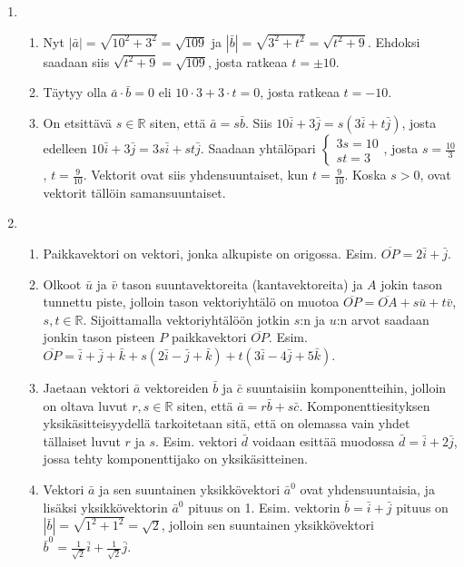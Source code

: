 \documentclass[12pt,fleqn]{article}
\begin{document}
\begin{enumerate}[label=\textbf{\arabic*.}]
\item
\begin{enumerate}[label=\textbf{\alph*)}]
\item Nyt \(|\bar{a}|=\sqrt{10^2+3^2}=\sqrt{109}\) ja \(|\bar{b}|=\sqrt{3^2+t^2}=\sqrt{t^2+9}\). Ehdoksi saadaan siis \(\sqrt{t^2+9}=\sqrt{109}\), josta ratkeaa \(t=\pm 10\).
\item Täytyy olla \(\bar{a}\cdot \bar{b}=0\) eli \(10\cdot 3+3\cdot t=0\), josta ratkeaa \(t=-10\).
\item On etsittävä \(s\in \mathbb{R}\) siten, että \(\bar{a}=s\bar{b}\). Siis \(10\bar{i}+3\bar{j}=s(3\bar{i}+t\bar{j})\), josta edelleen \(10\bar{i}+3\bar{j}=3s\bar{i}+st\bar{j}\). Saadaan yhtälöpari \(
\begin{cases}
3s=10 \\
st=3
\end{cases}
\), josta \(s=\frac{10}{3}\), \(t=\frac{9}{10}\). Vektorit ovat siis yhdensuuntaiset, kun \(t=\frac{9}{10}\). Koska \(s>0\), ovat vektorit tällöin samansuuntaiset.
\end{enumerate}

\item
\begin{enumerate}[label=\textbf{\alph*)}]
\item Paikkavektori on vektori, jonka alkupiste on origossa. Esim. \(\overline{OP}=2\bar{i}+\bar{j}\).
\item Olkoot \(\bar{u}\) ja \(\bar{v}\) tason suuntavektoreita (kantavektoreita) ja \(A\) jokin tason tunnettu piste, jolloin tason vektoriyhtälö on muotoa \(\overline{OP}=\overline{OA}+s\bar{u}+t\bar{v}\), \(s,t\in \mathbb{R}\). Sijoittamalla vektoriyhtälöön jotkin \(s\):n ja \(u\):n arvot saadaan jonkin tason pisteen \(P\) paikkavektori \(\overline{OP}\). Esim. \(\overline{OP}=\bar{i}+\bar{j}+\bar{k}+s(2\bar{i}-\bar{j}+\bar{k})+t(3\bar{i}-4\bar{j}+5\bar{k})\).
\item Jaetaan vektori \(\bar{a}\) vektoreiden \(\bar{b}\) ja \(\bar{c}\) suuntaisiin komponentteihin, jolloin on oltava luvut \(r,s\in \mathbb{R}\) siten, että \(\bar{a}=r\bar{b}+s\bar{c}\). Komponenttiesityksen yksikäsitteisyydellä tarkoitetaan sitä, että on olemassa vain yhdet tällaiset luvut \(r\) ja \(s\). Esim. vektori \(\bar{d}\) voidaan esittää muodossa \(\bar{d}=\bar{i}+2\bar{j}\), jossa tehty komponenttijako on yksikäsitteinen.
\item Vektori \(\bar{a}\) ja sen suuntainen yksikkövektori \(\bar{a}^0\) ovat yhdensuuntaisia, ja lisäksi yksikkövektorin \(\bar{a}^0\) pituus on 1. Esim. vektorin \(\bar{b}=\bar{i}+\bar{j}\) pituus on \(|\bar{b}|=\sqrt{1^2+1^2}=\sqrt{2}\), jolloin sen suuntainen yksikkövektori \(\bar{b}^0=\frac{1}{\sqrt{2}}\bar{i}+\frac{1}{\sqrt{2}}\bar{j}\).
\end{enumerate}


\end{enumerate}
\end{document}
